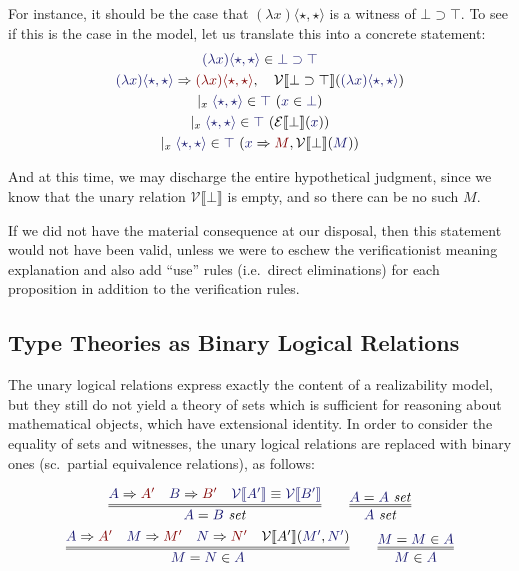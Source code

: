\documentclass[11pt]{amsart}
\theoremstyle{definition}
\theoremstyle{remark}
\numberwithin{equation}{section}
\def\InputModeColorName{MidnightBlue}
\def\OutputModeColorName{Maroon}
\newcommand\InputMode[1]{{\color{\InputModeColorName}{#1}}}
\newcommand\OutputMode[1]{{\color{\OutputModeColorName}{#1}}}
\newcommand\HypJ[2]{#1\ (#2)}
\newcommand\GenJ[2]{\vert_{#1}\; #2}
\newcommand\IsSet[1]{\InputMode{#1}\ \mathit{set}}
\newcommand\EqSet[2]{\InputMode{#1}=\InputMode{#2}\ \mathit{set}}
\newcommand\Member[2]{\InputMode{#1}\in \InputMode{#2}}
\newcommand\EqMember[3]{\InputMode{#1}=\InputMode{#2}\in \InputMode{#3}}
\newcommand\Eval[2]{\InputMode{#1}\Rightarrow \OutputMode{#2}}
\newcommand\SEM[1]{\llbracket#1 \rrbracket}
\newcommand\VAL[1]{\mathcal{V}\SEM{#1}}
\newcommand\EXP[1]{\mathcal{E}\SEM{#1}}
\newcommand\True{\top}
\newcommand\False{\bot}
\newcommand\Imp[2]{#1\supset #2}
\newcommand\It{\star}
\newcommand\Lam[2]{(\lambda #1) #2}
\newcommand\Pair[2]{\langle #1, #2 \rangle}
\begin{document}
For instance, it should be the case that $\Lam{x}{\Pair{\It}{\It}}$ is a witness
of $\Imp{\False}{\True}$. To see if this is the case in the
model, let us translate this into a concrete statement:
\begin{gather}
  \Member{\Lam{x}{\Pair{\It}{\It}}}{\Imp{\False}{\True}}\\
  \Eval{\Lam{x}{\Pair{\It}{\It}}}{\Lam{x}{\Pair{\It}{\It}}}, \quad
    \VAL{\Imp{\False}{\True}}(\InputMode{\Lam{x}{\Pair{\It}{\It}}})\\
  \GenJ{x}{
    \HypJ{\Member{\Pair{\It}{\It}}{\True}}{\Member{x}{\False}}
  }\\
  \GenJ{x}{
    \HypJ{\Member{\Pair{\It}{\It}}{\True}}{\EXP{\False}(\InputMode{x})}
  }\\
  \GenJ{x}{
    \HypJ{\Member{\Pair{\It}{\It}}{\True}}{\Eval{x}{M}, \VAL{\False}(\InputMode{M})}
  }
\end{gather}

And at this time, we may discharge the entire hypothetical judgment, since we
know that the unary relation $\VAL{\False}$ is empty, and so there can be no
such $M$.

If we did not have the material consequence at our disposal, then this statement
would not have been valid, unless we were to eschew the verificationist meaning
explanation and also add ``use'' rules (i.e.\ direct eliminations) for each
proposition in addition to the verification rules.

\subsection{Type Theories as Binary Logical Relations}

The unary logical relations express exactly the content of a realizability
model, but they still do not yield a theory of sets which is sufficient for
reasoning about mathematical objects, which have extensional identity. In order
to consider the equality of sets and witnesses, the unary logical relations
are replaced with binary ones (sc.\ partial equivalence relations), as follows:

\begin{gather*}
  \infer={
    \EqSet{A}{B}
  }{
    \Eval{A}{A'} &
    \Eval{B}{B'} &
    \InputMode{\VAL{A'}}\equiv\InputMode{\VAL{B'}}
  }\qquad
  \infer={
    \IsSet{A}
  }{
   \EqSet{A}{A}
  }\\
  \infer={
    \EqMember{M}{N}{A}
  }{
    \Eval{A}{A'} &
    \Eval{M}{M'} &
    \Eval{N}{N'} &
    \VAL{A'}(\InputMode{M'}, \InputMode{N'})
  }\qquad
  \infer={
    \Member{M}{A}
  }{
    \EqMember{M}{M}{A}
  }
\end{gather*}
\end{document}
